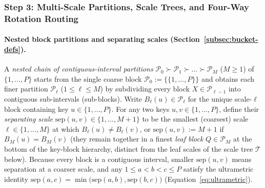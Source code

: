 \documentclass[11pt]{article}
\theoremstyle{definition}
\theoremstyle{remark}
\newcommand{\sep}{\mathrm{sep}}
\begin{document}
\subsubsection{Step 3: Multi-Scale Partitions, Scale Trees, and Four-Way Rotation Routing}
\label{subsubsec:step3}

\paragraph{Nested block partitions and separating scales (Section~\ref{subsec:bucket-defs}).}
A \emph{nested chain of contiguous-interval partitions} $\mathcal{P}_0 \succ \mathcal{P}_1 \succ \dots \succ \mathcal{P}_M$ ($M \ge 1$) of $\{1, \dots, P\}$ starts from the single coarse block $\mathcal{P}_0 := \{\{1, \dots, P\}\}$ and obtains each finer partition $\mathcal{P}_\ell$ ($1 \le \ell \le M$) by subdividing every block $X \in \mathcal{P}_{\ell-1}$ into contiguous sub-intervals (sub-blocks). Write $B_\ell(u) \in \mathcal{P}_\ell$ for the unique scale-$\ell$ block containing key $u \in \{1, \dots, P\}$. For any two keys $u, v \in \{1, \dots, P\}$, define their \emph{separating scale} $\sep(u, v) \in \{1, \dots, M + 1\}$ to be the smallest (coarsest) scale $\ell \in \{1, \dots, M\}$ at which $B_\ell(u) \ne B_\ell(v)$, or $\sep(u, v) := M + 1$ if $B_M(u) = B_M(v)$ (they remain together in a finest \emph{leaf block} $Q \in \mathcal{P}_M$ at the bottom of the key-block hierarchy, distinct from the leaf scales of the scale tree $\mathcal{T}$ below). Because every block is a contiguous interval, smaller $\sep(u, v)$ means separation at a coarser scale, and any $1 \le a < b < c \le P$ satisfy the ultrametric identity $\sep(a, c) = \min\big(\sep(a, b), \sep(b, c)\big)$ (Equation~\eqref{eq:ultrametric}).
\end{document}
